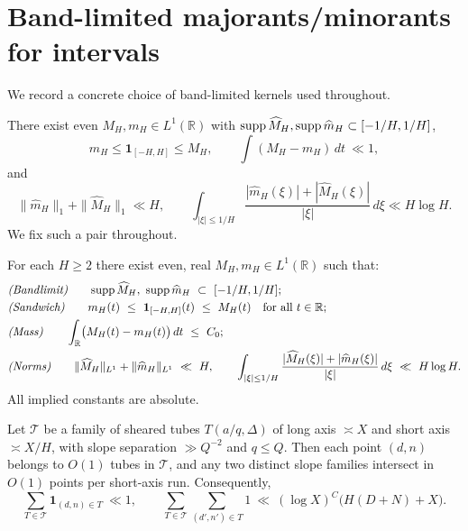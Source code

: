 
\section{Band-limited majorants/minorants for intervals}\label{app:kernels}\label{app:BS}

We record a concrete choice of band-limited kernels used throughout.

There exist even $M_H,m_H\in L^1(\mathbb R)$ with $\operatorname{supp} \widehat M_H,\operatorname{supp} \widehat m_H\subset[-1/H,1/H]$, 
\[
m_H\le \mathbf 1_{[-H,H]}\le M_H,\qquad \int (M_H-m_H)\,dt\ \ll 1,
\]
and
\[
\|\widehat m_H\|_1+\|\widehat M_H\|_1\ll H,\qquad \int_{|\xi|\le 1/H}\frac{|\widehat m_H(\xi)|+|\widehat M_H(\xi)|}{|\xi|}\,d\xi\ll H\log H.
\]
We fix such a pair throughout.


\begin{theorem}\label{thm:BS}
For each $H\ge 2$ there exist even, real $M_H,m_H\in L^1(\mathbb R)$ such that:
\begin{align*}
&\text{\emph{(Bandlimit)}}\qquad \mathrm{supp}\,\widehat M_H,\ \mathrm{supp}\,\widehat m_H\ \subset\ [-1/H,1/H];\\
&\text{\emph{(Sandwich)}}\qquad m_H(t)\ \le\ \mathbf 1_{[-H,H]}(t)\ \le\ M_H(t)\quad\text{for all }t\in\mathbb R;\\
&\text{\emph{(Mass)}}\qquad \int_{\mathbb R}\!\big(M_H(t)-m_H(t)\big)\,dt\ \le\ C_0;\\
&\text{\emph{(Norms)}}\qquad \|\widehat M_H\|_{L^1}+\|\widehat m_H\|_{L^1}\ \ll\ H,\qquad
\int_{|\xi|\le 1/H}\frac{|\widehat M_H(\xi)|+|\widehat m_H(\xi)|}{|\xi|}\,d\xi\ \ll\ H\log H.
\end{align*}
All implied constants are absolute.
\end{theorem}

\begin{lemma}\label{lem:BS.degeneracy}
Let $\mathcal T$ be a family of sheared tubes $T(a/q,\Delta)$ of long axis $\asymp X$ and short axis $\asymp X/H$, with slope separation $\gg Q^{-2}$ and $q\le Q$. Then each point $(d,n)$ belongs to $O(1)$ tubes in $\mathcal T$, and any two distinct slope families intersect in $O(1)$ points per short-axis run. Consequently,
\[
\sum_{T\in\mathcal T} \mathbf 1_{(d,n)\in T}\ \ll 1,\qquad
\sum_{T\in\mathcal T}\sum_{(d',n')\in T} 1\ \ll\ (\log X)^C\big(H(D+N)+X\big).
\]
\end{lemma}

